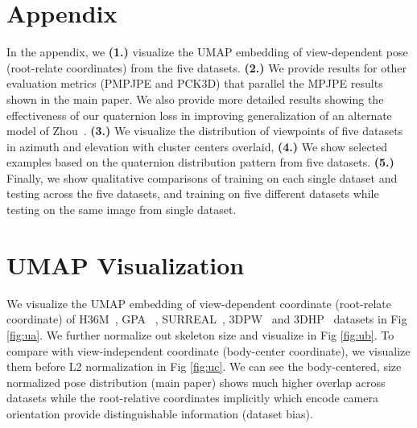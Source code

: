 \documentclass[runningheads]{llncs}
\begin{document}



\newpage

\appendix
\section*{Appendix}

 In the appendix, we \textbf{(1.)} visualize the UMAP embedding \cite{mcinnes2018umap-software} of view-dependent pose (root-relate coordinates) from the five datasets. \textbf{(2.)} We provide results for other evaluation metrics (PMPJPE and PCK3D) that parallel the MPJPE results shown in the main paper.   We also provide more detailed results showing the effectiveness of our quaternion loss in improving generalization of an alternate model of Zhou~\cite{Zhou_2017_ICCV}.  \textbf{(3.)} We visualize the distribution of viewpoints of five datasets in azimuth and elevation with cluster centers overlaid, \textbf{(4.)} We show selected examples based on the quaternion distribution pattern from five datasets. \textbf{(5.)} Finally, we show qualitative comparisons of training on each single dataset and testing across the five datasets, and training on five different datasets while testing on the same image from single dataset.


\section{UMAP Visualization}
We visualize the UMAP \cite{mcinnes2018umap-software} embedding of view-dependent coordinate (root-relate coordinate) of H36M~\cite{h36m_pami}, GPA~\cite{gpa} , SURREAL~\cite{varol17_surreal}, 3DPW~\cite{inthewildeccv2018} and 3DHP~\cite{mono_3dhp2017} datasets in Fig \ref{fig:ua}.
We further normalize out skeleton size and visualize in Fig \ref{fig:ub}. To compare with view-independent coordinate (body-center coordinate), we visualize them before L2 normalization in Fig \ref{fig:uc}. We can see the body-centered, size normalized pose distribution (main paper) shows much higher overlap across datasets while the root-relative coordinates implicitly which encode camera orientation provide distinguishable information (dataset bias).
\end{document}
